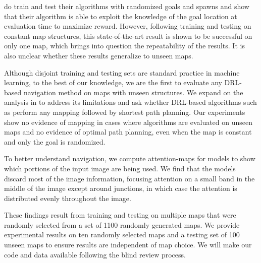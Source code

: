 \cite{MiPaViICLR2017} do train and test their algorithms with randomized goals and spawns and show that their algorithm is able to exploit the knowledge of the goal location at evaluation time to maximize reward.
However, following training and testing on constant map structures, this state-of-the-art result is shown to be successful on only one map, which brings into question the repeatability of the results.
It is also unclear whether these results generalize to unseen maps.

Although disjoint training and testing sets are standard practice in machine learning, to the best of our knowledge, we are the first to evaluate any DRL-based navigation method on maps with unseen structures.
We expand on the analysis in \cite{MiPaViICLR2017} to address its limitations and ask whether DRL-based algorithms such as \NavAiiiCDiDiiL{} perform any mapping followed by shortest path planning.
Our experiments show no evidence of mapping in cases where algorithms are evaluated on unseen maps and no evidence of optimal path planning, even when the map is constant and only the goal is randomized.

To better understand navigation, we compute attention-maps for models to show which portions of the input image are being used.
We find that the models discard most of the image information, focusing attention on a small band in the middle of the image except around junctions, in which case the attention is distributed evenly throughout the image.

These findings result from training and testing on multiple maps that were randomly selected from a set of 1100 randomly generated maps.
We provide experimental results on ten randomly selected maps and a testing set of 100 unseen maps to ensure results are independent of map choice.
We will make our code and data available following the blind review process.




